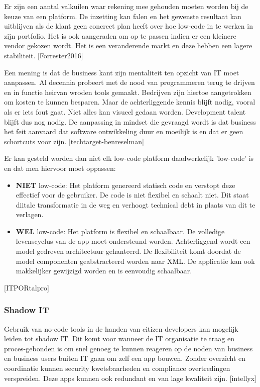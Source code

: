 Er zijn een aantal valkuilen waar rekening mee gehouden moeten worden bij de keuze van een platform. De inzetting kan falen en het gewenste resultaat kan uitblijven als de klant geen concreet plan heeft over hoe low-code in te werken in zijn portfolio. Het is ook aangeraden om op te passen indien er een kleinere vendor gekozen wordt. Het is een veranderende markt en deze hebben een lagere stabiliteit. [Forrester2016]

Een mening is dat de business kant zijn mentaliteit ten opzicht van IT moet aanpassen. Al decennia probeert met de nood van programmeren terug te drijven en in functie heirvan wroden tools gemaakt. Bedrijven zijn hiertoe aangetrokken om kosten te kunnen besparen. Maar de achterliggende kennis blijft nodig, vooral als er iets fout gaat. Niet alles kan visueel gedaan worden. Development talent blijft dus nog nodig. De aanpassing in mindset die gevraagd wordt is dat business het feit aanvaard dat software ontwikkeling duur en moeilijk is en dat er geen schortcuts voor zijn. [techtarget-benreselman]

Er kan gesteld worden dan niet elk low-code platform daadwerkelijk 'low-code' is en dat men hiervoor moet oppassen:
\begin{itemize}
    \item \textbf{NIET} low-code: Het platform genereerd statisch code en verstopt deze effectief voor de gebruiker. De code is niet flexibel en schaalt niet. Dit staat diitale transformatie in de weg en verhoogt technical debt in plaats van dit te verlagen.
    \item \textbf{WEL} low-code: Het platform is flexibel en schaalbaar. De volledige levenscyclus van de app moet ondersteund worden. Achterliggend wordt een model gedreven architectuur gehanteerd. De flexibiliteit komt doordat de model componenten geabstracteerd worden naar XML. De applicatie kan ook makkelijker gewijzigd worden en is eenvoudig schaalbaar.
\end{itemize} [ITPORtalpro]

\subsubsection{Shadow IT}

Gebruik van no-code tools in de handen van citizen developers kan mogelijk leiden tot shadow IT. Dit komt voor wanneer de IT organisatie te traag en proces-gebonden is om snel genoeg te kunnen reageren op de noden van business en business users buiten IT gaan om zelf een app bouwen. Zonder overzicht en coordinatie kunnen security kwetsbaarheden en compliance overtredingen verspreiden. Deze apps kunnen ook redundant en van lage kwaliteit zijn. [intellyx]

